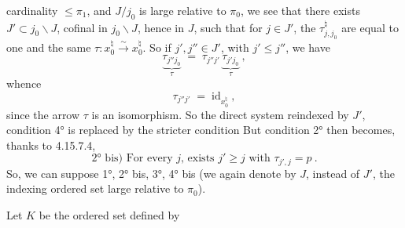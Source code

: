 \documentclass[11pt]{article}
\newcommand{\msp}[1]{\marginpar{\footnotesize [#1]}}
\newcommand{\id}{\mathrm{id}}
\begin{document}
\msp{page 446}
cardinality $\leqslant \pi_1$, and $J/j_0$ is large relative to $\pi_0$, we see that there exists $J' \subset j_0\backslash J$, cofinal in $j_0\backslash J$, hence in $J$, such that for $j \in J'$, the $\tau^\natural_{j,j_0}$ are equal to one and the same $\tau : x_0^\natural \xrightarrow{\sim} x_0^\natural$. So if $j', j'' \in J'$, with $j' \leqslant j''$, we have
\[
\underbrace{\tau_{j''j_0}}_{\tau} \;=\; \tau_{j''j'}\,\underbrace{\tau_{j'j_0}}_{\tau}\ ,
\]
whence
\[
\tau_{j''j'} \;=\; \id_{x_0^\natural}\ ,
\]
since the arrow $\tau$ is an isomorphism. So the direct system reindexed by $J'$, condition 4° is replaced by the stricter condition \fbox{4° bis) $\tau^\natural_{j',j} = \id_{x_0^\natural}$.} But condition 2° then becomes, thanks to 4.15.7.4,
\[
\boxed{\text{2° bis) For every } j\text{, exists } j' \geqslant j \text{ with } \tau_{j',j} = p}\ .
\]
So, we can suppose 1°, 2° bis, 3°, 4° bis (we again denote by $J$, instead of $J'$, the indexing ordered set large relative to $\pi_0$).

Let $K$ be the ordered set defined by
\end{document}
